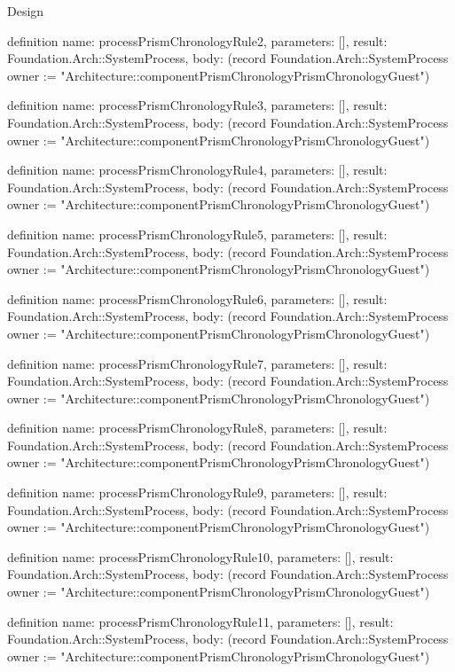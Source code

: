 \begin{lexlean}{Design}
\begin{semanticmodule}
definition{
  name: processPrismChronologyRule2,
  parameters: [],
  result: Foundation.Arch::SystemProcess,
  body: (record Foundation.Arch::SystemProcess {owner := "Architecture::componentPrismChronologyPrismChronologyGuest"})
}

definition{
  name: processPrismChronologyRule3,
  parameters: [],
  result: Foundation.Arch::SystemProcess,
  body: (record Foundation.Arch::SystemProcess {owner := "Architecture::componentPrismChronologyPrismChronologyGuest"})
}

definition{
  name: processPrismChronologyRule4,
  parameters: [],
  result: Foundation.Arch::SystemProcess,
  body: (record Foundation.Arch::SystemProcess {owner := "Architecture::componentPrismChronologyPrismChronologyGuest"})
}

definition{
  name: processPrismChronologyRule5,
  parameters: [],
  result: Foundation.Arch::SystemProcess,
  body: (record Foundation.Arch::SystemProcess {owner := "Architecture::componentPrismChronologyPrismChronologyGuest"})
}

definition{
  name: processPrismChronologyRule6,
  parameters: [],
  result: Foundation.Arch::SystemProcess,
  body: (record Foundation.Arch::SystemProcess {owner := "Architecture::componentPrismChronologyPrismChronologyGuest"})
}

definition{
  name: processPrismChronologyRule7,
  parameters: [],
  result: Foundation.Arch::SystemProcess,
  body: (record Foundation.Arch::SystemProcess {owner := "Architecture::componentPrismChronologyPrismChronologyGuest"})
}

definition{
  name: processPrismChronologyRule8,
  parameters: [],
  result: Foundation.Arch::SystemProcess,
  body: (record Foundation.Arch::SystemProcess {owner := "Architecture::componentPrismChronologyPrismChronologyGuest"})
}

definition{
  name: processPrismChronologyRule9,
  parameters: [],
  result: Foundation.Arch::SystemProcess,
  body: (record Foundation.Arch::SystemProcess {owner := "Architecture::componentPrismChronologyPrismChronologyGuest"})
}

definition{
  name: processPrismChronologyRule10,
  parameters: [],
  result: Foundation.Arch::SystemProcess,
  body: (record Foundation.Arch::SystemProcess {owner := "Architecture::componentPrismChronologyPrismChronologyGuest"})
}

definition{
  name: processPrismChronologyRule11,
  parameters: [],
  result: Foundation.Arch::SystemProcess,
  body: (record Foundation.Arch::SystemProcess {owner := "Architecture::componentPrismChronologyPrismChronologyGuest"})
}


\end{semanticmodule}
\end{lexlean}
